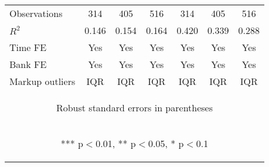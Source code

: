 \begin{tabular}{lcccccc}
Observations & 314 & 405 & 516 & 314 & 405 & 516 \\
$R^2$ & 0.146 & 0.154 & 0.164 & 0.420 & 0.339 & 0.288 \\
Time FE & Yes & Yes & Yes & Yes & Yes & Yes \\
Bank FE & Yes & Yes & Yes & Yes & Yes & Yes \\
 Markup outliers & IQR & IQR & IQR & IQR & IQR & IQR \\ \hline
\multicolumn{7}{c}{\begin{footnotesize} Robust standard errors in parentheses\end{footnotesize}} \\
\multicolumn{7}{c}{\begin{footnotesize} *** p$<$0.01, ** p$<$0.05, * p$<$0.1\end{footnotesize}} \\
\end{tabular}



